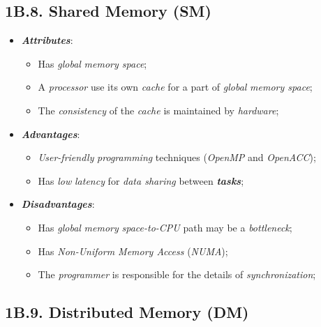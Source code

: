 \subsection*{\large{\textbf{1B.8. Shared Memory (SM)}}}
\label{ssec:lecture-1B8}

\begin{itemize}
    \item \textbf{\emph{Attributes}}:
    \vspace{-0.2cm}
    \begin{itemize}
        \item Has \emph{global} \emph{memory space};
        \item A \emph{processor} use its own \emph{cache} for a part of \emph{global} \emph{memory space};
        \item The \emph{consistency} of the \emph{cache} is maintained by \emph{hardware};
    \end{itemize}
    \item \textbf{\emph{Advantages}}:
    \vspace{-0.2cm}
    \begin{itemize}
        \item \emph{User-friendly} \emph{programming} techniques (\emph{OpenMP} and \emph{OpenACC});
        \item Has \emph{low} \emph{latency} for \emph{data sharing} between \textbf{\emph{tasks}};
    \end{itemize}
    \item \textbf{\emph{Disadvantages}}:
    \vspace{-0.2cm}
    \begin{itemize}
        \item Has \emph{global} \emph{memory} \emph{space-to-CPU} path may be a \emph{bottleneck};
        \item Has \emph{Non-Uniform Memory Access} (\emph{NUMA});
        \item The \emph{programmer} is responsible for the details of \emph{synchronization};
    \end{itemize}
\end{itemize}

\newpage

\subsection*{\large{\textbf{1B.9. Distributed Memory (DM)}}}
\label{ssec:lecture-1B9}

